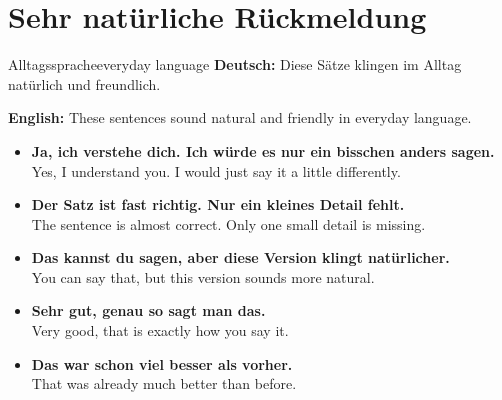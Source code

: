 \documentclass[a4paper,11pt]{article}
\newcommand{\GermanText}[1]{\textbf{Deutsch: }#1\par}
\newcommand{\EnglishText}[1]{{\small\color{SoftGray}\textbf{English: }#1\par}}
\newcommand{\ExampleItem}[2]{\item \textbf{#1}\\{\small\color{SoftGray}#2}}
\begin{document}
    
    \section{Sehr natürliche Rückmeldung}
        
        \begin{grammarentry}{Alltagssprache}{everyday language}
            \GermanText{Diese Sätze klingen im Alltag natürlich und freundlich.}
            \EnglishText{These sentences sound natural and friendly in everyday language.}
            
            \begin{exbox}
                \begin{itemize}
                    \ExampleItem{Ja, ich verstehe dich. Ich würde es nur ein bisschen anders sagen.}{Yes, I understand you. I would just say it a little differently.}
                    \ExampleItem{Der Satz ist fast richtig. Nur ein kleines Detail fehlt.}{The sentence is almost correct. Only one small detail is missing.}
                    \ExampleItem{Das kannst du sagen, aber diese Version klingt natürlicher.}{You can say that, but this version sounds more natural.}
                    \ExampleItem{Sehr gut, genau so sagt man das.}{Very good, that is exactly how you say it.}
                    \ExampleItem{Das war schon viel besser als vorher.}{That was already much better than before.}
                \end{itemize}
            \end{exbox}
        \end{grammarentry}
\end{document}

